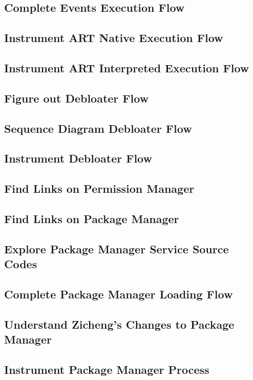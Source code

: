 \subsection{Complete Events Execution Flow}
\subsection{Instrument ART Native Execution Flow}
\subsection{Instrument ART Interpreted Execution Flow}
\subsection{Figure out Debloater Flow} 
\subsection{Sequence Diagram Debloater Flow}
\subsection{Instrument Debloater Flow}
\subsection{Find Links on Permission Manager}
\subsection{Find Links on Package Manager}
\subsection{Explore Package Manager Service Source Codes}
\subsection{Complete Package Manager Loading Flow}
\subsection{Understand Zicheng's Changes to Package Manager}
\subsection{Instrument Package Manager Process}

% 

